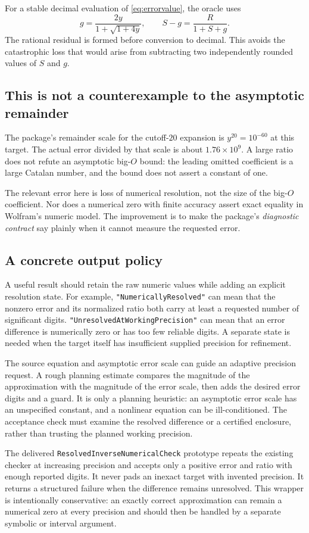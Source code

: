 \documentclass[11pt,letterpaper]{article}
\newcommand{\code}[1]{{\small\nolinkurl{#1}}}
\begin{document}
For a stable decimal evaluation of \eqref{eq:errorvalue}, the oracle uses
\[
 g=\frac{2y}{1+\sqrt{1+4y}},\qquad
 S-g=\frac{R}{1+S+g}.
\]
The rational residual is formed before conversion to decimal. This avoids the catastrophic loss that would arise from subtracting two independently rounded values of $S$ and $g$.

\subsection{This is not a counterexample to the asymptotic remainder}
The package's remainder scale for the cutoff-$20$ expansion is $y^{20}=10^{-60}$ at this target. The actual error divided by that scale is about $1.76\times10^9$. A large ratio does not refute an asymptotic big-$O$ bound: the leading omitted coefficient is a large Catalan number, and the bound does not assert a constant of one.

The relevant error here is loss of numerical resolution, not the size of the big-$O$ coefficient. Nor does a numerical zero with finite accuracy assert exact equality in Wolfram's numeric model. The improvement is to make the package's \emph{diagnostic contract} say plainly when it cannot measure the requested error.

\subsection{A concrete output policy}
A useful result should retain the raw numeric values while adding an explicit resolution state. For example, \code{"NumericallyResolved"} can mean that the nonzero error and its normalized ratio both carry at least a requested number of significant digits. \code{"UnresolvedAtWorkingPrecision"} can mean that an error difference is numerically zero or has too few reliable digits. A separate state is needed when the target itself has insufficient supplied precision for refinement.

The source equation and asymptotic error scale can guide an adaptive precision request. A rough planning estimate compares the magnitude of the approximation with the magnitude of the error scale, then adds the desired error digits and a guard. It is only a planning heuristic: an asymptotic error scale has an unspecified constant, and a nonlinear equation can be ill-conditioned. The acceptance check must examine the resolved difference or a certified enclosure, rather than trusting the planned working precision.

The delivered \code{ResolvedInverseNumericalCheck} prototype repeats the existing checker at increasing precision and accepts only a positive error and ratio with enough reported digits. It never pads an inexact target with invented precision. It returns a structured failure when the difference remains unresolved. This wrapper is intentionally conservative: an exactly correct approximation can remain a numerical zero at every precision and should then be handled by a separate symbolic or interval argument.
\end{document}

